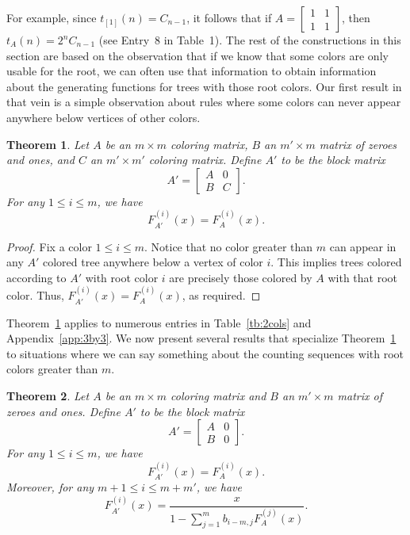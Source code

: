 \documentclass[12pt]{amsart}
\newtheorem{theorem}{Theorem}
\newcommand{\gff}[2]{F_{#2}^{(#1)}(x)}
\begin{document}
For example, since $t_{[1]}(n) = C_{n-1}$, it follows that if $A = \begin{bmatrix}
1 & 1 \\
1 & 1 
\end{bmatrix}$, then $t_{A}(n) = 2^{n}C_{n-1}$ (see Entry~8 in Table~1). 
The rest of the constructions in this section are based on the observation that if we know that some colors are only usable for the root, we can often use that information to obtain information about the generating functions for trees with those root colors. Our first result in that vein is a simple observation about rules where some colors can never appear anywhere below vertices of other colors.
\begin{theorem}\label{prop:blockul}
    Let $A$ be an $m\times m$ coloring matrix, $B$ an $m'\times m$ matrix of zeroes and ones, and $C$ an $m'\times m'$ coloring matrix. Define $A'$ to be the block matrix
    \[
    A'=\left[\begin{array}{c|c}A&0\\\hline B&C\end{array}\right].
    \]
    For any $1\leq i\leq m$, we have
    \[
    \gff{i}{A'}=\gff{i}{A}.
    \]
\end{theorem}
\begin{proof}
    Fix a color $1\leq i\leq m$. 
    Notice that no color greater than $m$ can appear in any $A'$ colored tree anywhere below a vertex of color $i$.
    This implies trees colored according to $A'$ with root color $i$ are precisely those colored by $A$ with that root color.
    Thus, $\gff{i}{A'}=\gff{i}{A}$, as required.
\end{proof}
Theorem~\ref{prop:blockul} applies to numerous entries in Table~\ref{tb:2cols} and Appendix~\ref{app:3by3}.
We now present several results that specialize Theorem~\ref{prop:blockul} to situations where we can say something about the counting sequences with root colors greater than $m$.
\begin{theorem}\label{prop:rootonlysingle}
    Let $A$ be an $m\times m$ coloring matrix and $B$ an $m'\times m$ matrix of zeroes and ones. Define $A'$ to be the block matrix
    \[
    A'=\left[\begin{array}{c|c}A&0\\\hline B&0\end{array}\right].
    \]
    For any $1\leq i\leq m$, we have
    \[
    \gff{i}{A'}=\gff{i}{A}.
    \]
    Moreover, for any $m+1\leq i\leq m+m'$,
    we have
    \[
    \gff{i}{A'}=\frac{x}{1-\sum_{j=1}^mb_{i-m,j}\gff{j}{A}}.
    \]
\end{theorem}
\end{document}
